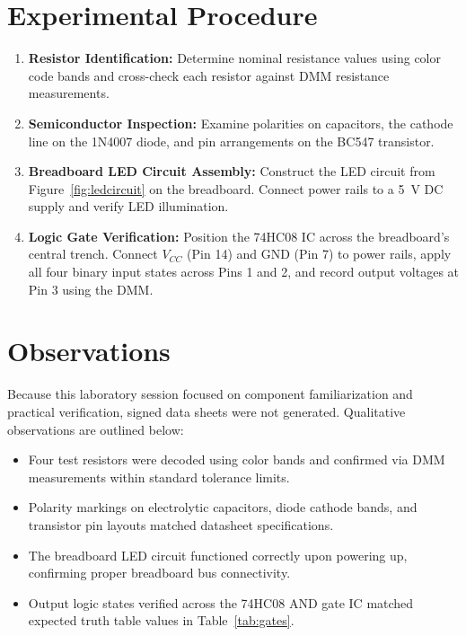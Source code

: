 \section{Experimental Procedure}
\begin{enumerate}
	\item \textbf{Resistor Identification:} Determine nominal resistance values using color code bands and cross-check each resistor against DMM resistance measurements.
	\item \textbf{Semiconductor Inspection:} Examine polarities on capacitors, the cathode line on the 1N4007 diode, and pin arrangements on the BC547 transistor.
	\item \textbf{Breadboard LED Circuit Assembly:} Construct the LED circuit from Figure~\ref{fig:ledcircuit} on the breadboard. Connect power rails to a \qty{5}{\volt} DC supply and verify LED illumination.
	\item \textbf{Logic Gate Verification:} Position the 74HC08 IC across the breadboard's central trench. Connect $V_{CC}$ (Pin 14) and GND (Pin 7) to power rails, apply all four binary input states across Pins 1 and 2, and record output voltages at Pin 3 using the DMM.
\end{enumerate}

\section{Observations}
Because this laboratory session focused on component familiarization and practical verification, signed data sheets were not generated. Qualitative observations are outlined below:

\begin{itemize}
	\item Four test resistors were decoded using color bands and confirmed via DMM measurements within standard tolerance limits.
	\item Polarity markings on electrolytic capacitors, diode cathode bands, and transistor pin layouts matched datasheet specifications.
	\item The breadboard LED circuit functioned correctly upon powering up, confirming proper breadboard bus connectivity.
	\item Output logic states verified across the 74HC08 AND gate IC matched expected truth table values in Table~\ref{tab:gates}.
\end{itemize}

